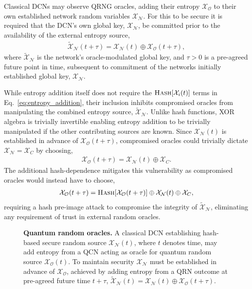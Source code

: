 Classical DCNs may observe QRNG oracles, adding their entropy $\mathcal{X}_\mathcal{O}$ to their own established network random variables $\mathcal{X}_\mathcal{N}$. For this to be secure it is required that the DCN's own global key, $\mathcal{X}_\mathcal{N}$, be committed prior to the availability of the external entropy source,
\begin{align}
	\tilde{\mathcal{X}}_\mathcal{N}(t+\tau) = \mathcal{X}_\mathcal{N}(t) \oplus \mathcal{X}_\mathcal{O}(t+\tau),
\end{align}
where $\mathcal{\tilde X}_\mathcal{N}$ is the network's oracle-modulated global key, and \mbox{$\tau>0$} is a pre-agreed future point in time, subsequent to commitment of the networks initially established global key, $\mathcal{X}_\mathcal{N}$.

While entropy addition itself does not require the $\textsc{Hash}[\mathcal{X}_i(t)]$ terms in Eq.~\eqref{eq:entropy_addition}, their inclusion inhibits compromised oracles from manipulating the combined entropy source, $\tilde{\mathcal{X}}_\mathcal{N}$. Unlike hash functions, XOR algebra is trivially invertible enabling entropy addition to be trivially manipulated if the other contributing sources are known. Since $\mathcal{X}_\mathcal{N}(t)$ is established in advance of $\mathcal{X}_\mathcal{O}(t+\tau)$, compromised oracles could trivially dictate \mbox{$\mathcal{X}_\mathcal{N}=\mathcal{X}_C$} by choosing,
\begin{align}
	\mathcal{X}_\mathcal{O}(t+\tau) = \mathcal{X}_\mathcal{N}(t) \oplus \mathcal{X}_C.
\end{align}
The additional hash-dependence mitigates this vulnerability as compromised oracles would instead have to choose,
\begin{align}
	\mathcal{X}_\mathcal{O}(t+\tau) = \textsc{Hash}[\mathcal{X}_\mathcal{O}(t+\tau)] \oplus \mathcal{X}_\mathcal{N}(t) \oplus \mathcal{X}_C,
\end{align}
requiring a hash pre-image attack to compromise the integrity of $\tilde{\mathcal{X}}_\mathcal{N}$, eliminating any requirement of trust in external random oracles.

\begin{figure}
	\begin{center}
		
		\caption{\textbf{Quantum random oracles.} A classical DCN establishing hash-based secure random source $\mathcal{X}_\mathcal{N}(t)$, where $t$ denotes time, may add entropy from a QCN acting as oracle for quantum random source $\mathcal{X}_\mathcal{O}(t)$. To maintain security $\mathcal{X}_\mathcal{N}$ must be established in advance of $\mathcal{X}_\mathcal{O}$, achieved by adding entropy from a QRN outcome at pre-agreed future time $t+\tau$, $\tilde{\mathcal{X}}_\mathcal{N}(t) = \mathcal{X}_\mathcal{N}(t) \oplus \mathcal{X}_\mathcal{O}(t+\tau)$.}
		\label{fig:QRNG_oracle}
	\end{center}
\end{figure}

